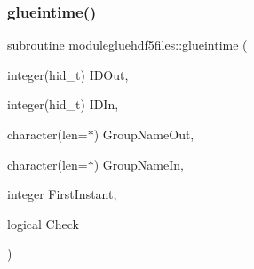 \subsubsection{\texorpdfstring{glueintime()}{glueintime()}}
{\footnotesize\ttfamily subroutine modulegluehdf5files\+::glueintime (\begin{DoxyParamCaption}\item[{integer(hid\+\_\+t)}]{I\+D\+Out,  }\item[{integer(hid\+\_\+t)}]{I\+D\+In,  }\item[{character(len=$\ast$)}]{Group\+Name\+Out,  }\item[{character(len=$\ast$)}]{Group\+Name\+In,  }\item[{integer}]{First\+Instant,  }\item[{logical}]{Check }\end{DoxyParamCaption})\hspace{0.3cm}{\ttfamily [private]}}

